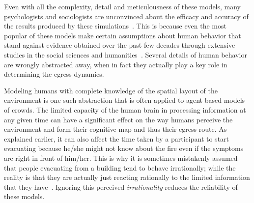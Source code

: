 Even with all the complexity, detail and meticulousness of these models, many psychologists and sociologists are unconvinced about the efficacy and accuracy of the results produced by these simulations~\cite{Aguirre:2004tn,Torres:2010tj,Sime:1995uu}. This is because even the most popular of these models make certain assumptions about human behavior that stand against evidence obtained over the past few decades through extensive studies in the social sciences and humanities~\cite{Torres:2010tj,Sime:1995uu}. Several details of human behavior are wrongly abstracted away, when in fact they actually play a key role in determining the egress dynamics.


Modeling humans with complete knowledge of the spatial layout of the environment is one such abstraction that is often applied to agent based models of crowds. The limited capacity of the human brain in processing information at any given time can have a significant effect on the way humans perceive the environment and form their cognitive map and thus their egress route. As explained earlier, it can also affect the time taken by a participant to start evacuating because he/she might not know about the fire even if the symptoms are right in front of him/her. This is why it is sometimes mistakenly assumed that people evacuating from a building tend to behave irrationally; while the reality is that they are actually just reacting rationally to the limited information that they have~\cite{Kobes:2009jx,Schadschneider:2008cz,Reicher:2008ep,Torres:2010tj,Paulsen:1984ti,Sime:1983uy}. Ignoring this perceived \emph{irrationality} reduces the reliability of these models.



